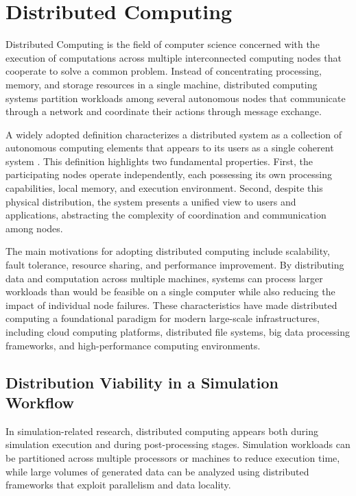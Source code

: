 \section{Distributed Computing}
\label{sec:cap2-distributed-computing}

Distributed Computing is the field of computer science concerned with the execution of computations across multiple interconnected computing nodes that cooperate to solve a common problem. Instead of concentrating processing, memory, and storage resources in a single machine, distributed computing systems partition workloads among several autonomous nodes that communicate through a network and coordinate their actions through message exchange.

A widely adopted definition characterizes a distributed system as a collection of autonomous computing elements that appears to its users as a single coherent system \parencite{steen2016distributed}. This definition highlights two fundamental properties. First, the participating nodes operate independently, each possessing its own processing capabilities, local memory, and execution environment. Second, despite this physical distribution, the system presents a unified view to users and applications, abstracting the complexity of coordination and communication among nodes.

The main motivations for adopting distributed computing include scalability, fault tolerance, resource sharing, and performance improvement. By distributing data and computation across multiple machines, systems can process larger workloads than would be feasible on a single computer while also reducing the impact of individual node failures. These characteristics have made distributed computing a foundational paradigm for modern large-scale infrastructures, including cloud computing platforms, distributed file systems, big data processing frameworks, and high-performance computing environments.

\subsection{Distribution Viability in a Simulation Workflow}
\label{subsec:cap2-distribution-viability-in-a-simulation-workflow}

In simulation-related research, distributed computing appears both during simulation execution and during post-processing stages. Simulation workloads can be partitioned across multiple processors or machines to reduce execution time, while large volumes of generated data can be analyzed using distributed frameworks that exploit parallelism and data locality.

